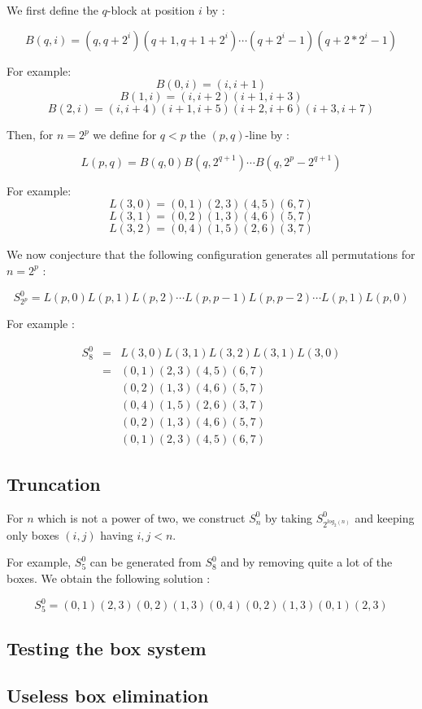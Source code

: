 \documentclass[11pt, a4paper]{article}
\begin{document}
We first define the $q$-block at position $i$ by :

$$B(q,i) = (q,q+2^i)(q+1,q+1+2^i)\cdots(q+2^i-1)(q+2*2^i-1)$$

For example: 
$$B(0,i) = (i,i+1)$$
$$B(1,i) = (i, i+2)(i+1, i+3)$$
$$B(2, i) = (i,i+4)(i+1,i+5)(i+2,i+6)(i+3,i+7)$$

Then, for $n=2^p$ we define for $q < p$ the $(p,q)$-line by :

$$L(p,q) = B(q,0) B(q,2^{q+1}) \cdots B(q,2^p-2^{q+1})$$

For example:
$$L(3,0) = (0,1)(2,3)(4,5)(6,7)$$
$$L(3,1) = (0,2)(1,3)(4,6)(5,7)$$
$$L(3,2) = (0,4)(1,5)(2,6)(3,7)$$

We now conjecture that the following configuration generates all permutations
for $n=2^p$ :

$$S_{2^p}^0 = L(p,0) L(p,1) L(p,2) \cdots L(p,p-1) L(p,p-2) \cdots L(p,1) L(p,0)$$

For example :

$$
\begin{aligned}
	S_8^0 & = & L(3,0) L(3,1) L(3,2) L(3,1) L(3,0) \\
        & = & (0,1)(2,3)(4,5)(6,7) \\
		& & (0,2)(1,3)(4,6)(5,7) \\
		& & (0,4)(1,5)(2,6)(3,7) \\
		& & (0,2)(1,3)(4,6)(5,7) \\
        & & (0,1)(2,3)(4,5)(6,7)
\end{aligned}$$

\subsection{Truncation}

For $n$ which is not a power of two, we construct $S_n^0$ by taking
$S_{2^{log_2(n)}}^0$ and keeping only boxes $(i, j)$ having $i, j < n$.

For example, $S_5^0$ can be generated from $S_8^0$ and by removing quite a lot
of the boxes. We obtain the following solution :

$$S_5^0 = (0,1)(2,3)(0,2)(1,3)(0,4)(0,2)(1,3)(0,1)(2,3)$$

\subsection{Testing the box system}

\subsection{Useless box elimination}
\end{document}
